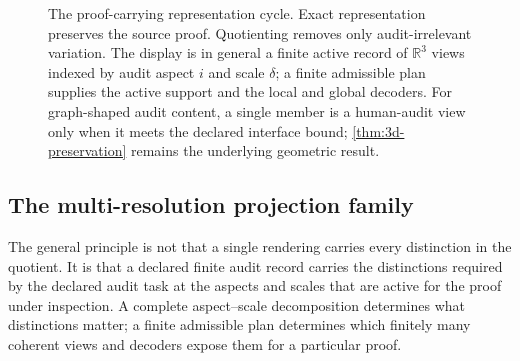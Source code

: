 \documentclass[11pt]{article}
\newcommand{\R}{\mathbb R}
\newcommand{\Enc}{\mathsf{Enc}}
\newcommand{\qA}{q_{\mathcal A}}
\newcommand{\mcA}{\mathcal A}
\theoremstyle{plain}
\theoremstyle{definition}
\theoremstyle{remark}
\begin{document}
\begin{figure}[H]
\centering
{}
\caption{The proof-carrying representation cycle.  Exact representation preserves the source proof.  Quotienting removes only audit-irrelevant variation.  The display is in general a finite active record of $\R^3$ views indexed by
audit aspect $i$ and scale $\delta$; a finite admissible plan supplies the active
support and the local and global decoders.  For graph-shaped audit content, a
single member is a human-audit view only when it meets the declared interface
bound; \cref{thm:3d-preservation} remains the underlying geometric result.}
\label{fig:cycle}
\end{figure}

\subsection{The multi-resolution projection family}
\label{sec:family}

The general principle is not that a single rendering carries every distinction
in the quotient.  It is that a declared finite audit record carries the
distinctions required by the declared audit task at the aspects and scales that
are active for the proof under inspection.  A complete aspect--scale
decomposition determines what distinctions matter; a finite admissible plan
determines which finitely many coherent views and decoders expose them for a
particular proof.
\end{document}
